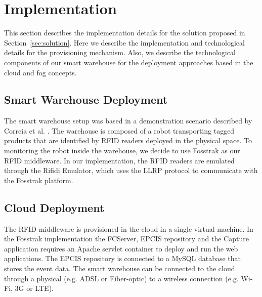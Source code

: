 
\section{Implementation}
\label{sec:implementation}
This section describes the implementation details for the solution proposed in Section~\ref{sec:solution}.
Here we describe the implementation and technological details for the provisioning mechanism. Also, we
describe the technological components of our smart warehouse for the deployment approaches based in
the cloud and fog concepts.

\subsection{Smart Warehouse Deployment}
\label{sub:impl_smart_place}
The smart warehouse setup was based in a demonstration scenario described by Correia et al. \cite{correiaalpharfid}.
The warehouse is composed of a robot transporting tagged products that are identified by \gls{RFID} readers
deployed in the physical space. To monitoring the robot inside the warehouse, we decide to use Fosstrak
as our \gls{RFID} middleware. In our implementation, the \gls{RFID} readers are emulated through the
Rifidi Emulator, which uses the \gls{LLRP} protocol to communicate with the Fosstrak platform.

\subsection{Cloud Deployment}
\label{sub:imp_smart_warehouse_cloud}

The \gls{RFID} middleware is provisioned in the cloud in a single virtual machine. In the
Fosstrak implementation the \gls{FCServer}, \gls{EPCIS} repository and the Capture application
requires an Apache servlet container to deploy and run the web applications. The \gls{EPCIS}
repository is connected to a MySQL database that stores the event data. The smart warehouse can be
connected to the cloud through a physical (e.g. \gls{ADSL} or Fiber-optic) to a wireless
connection (e.g. Wi-Fi, 3G or \gls{LTE}).

